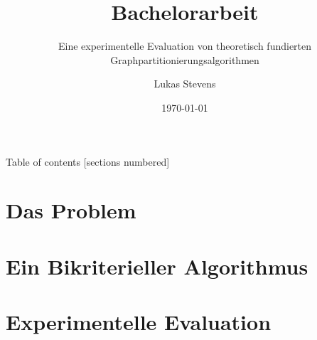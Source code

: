 \documentclass[10pt]{beamer}
\title{Bachelorarbeit}
\subtitle{Eine experimentelle Evaluation von theoretisch fundierten Graphpartitionierungsalgorithmen}
\date{\today}
\author{Lukas Stevens}
\institute{Technische Universität München}
\begin{document}
\maketitle

\begin{frame}{Table of contents}
  [sections numbered]
  \tableofcontents[hideallsubsections]
\end{frame}

\section{Das Problem}
%

\section{Ein Bikriterieller Algorithmus}


\section{Experimentelle Evaluation}
%
%
%
\end{document}
